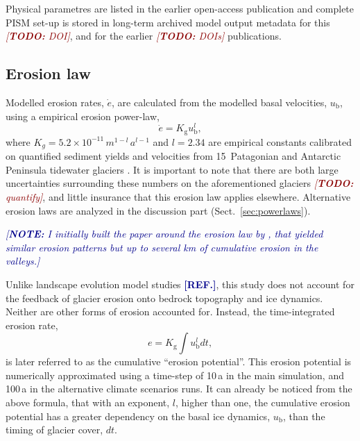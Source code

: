 \documentclass[utf8]{article}
\newcommand{\note}[1]{\textcolor{darkblue}{\emph{[\textbf{NOTE:} #1]}}}
\newcommand{\todo}[1]{\textcolor{darkred}{\emph{[\textbf{TODO:} #1]}}}
\newcommand{\aref}[0]{\textcolor{darkblue}{\textbf{[REF.]}}}
\begin{document}
    Physical parametres are listed in the earlier open-access publication
    \citep{Seguinot.etal.2018} and complete PISM set-up is stored in long-term
    archived model output metadata for this \todo{DOI}, and for the earlier
    \todo{DOIs} publications.

\subsection{Erosion law}

    Modelled erosion rates, $\dot{e}$, are calculated from the modelled basal
    velocities, $u_\mathrm{b}$, using a empirical erosion power-law,
    \begin{equation}
        \dot{e} = K_\mathrm{g} u_\mathrm{b}^l ,
    \end{equation}
    where $K_g = 5.2\times 10^{-11}\,m^{1-l}\,a^{l-1}$ and $l = 2.34$ are
    empirical constants calibrated on quantified sediment yields and velocities
    from 15~Patagonian and Antarctic Peninsula tidewater glaciers
    \citep{Koppes.etal.2015}. It is important to note that there are both large
    uncertainties surrounding these numbers on the aforementioned glaciers
    \todo{quantify}, and little insurance that this erosion law applies
    elsewhere. Alternative erosion laws are analyzed in the discussion part
    (Sect.~\ref{sec:powerlaws}).

    \note{I initially built the paper around the erosion law by
          \citep{Herman.etal.2015}, that yielded similar erosion patterns but
          up to several km of cumulative erosion in the valleys.}

    Unlike landscape evolution model studies \aref, this study does not account
    for the feedback of glacier erosion onto bedrock topography and ice dynamics.
    Neither are other forms of erosion accounted for. Instead, the
    time-integrated erosion rate,
    \begin{equation}
        e =  K_\mathrm{g} \int u_\mathrm{b}^l dt,
    \end{equation}
    is later referred to as the cumulative ``erosion potential''. This erosion
    potential is numerically approximated using a time-step of 10\,a in the
    main simulation, and 100\,a in the alternative climate scenarios runs. It
    can already be noticed from the above formula, that with an exponent, $l$,
    higher than one, the cumulative erosion potential has a greater dependency
    on the basal ice dynamics, $u_\mathrm{b}$, than the timing of glacier
    cover, $dt$.
\end{document}
